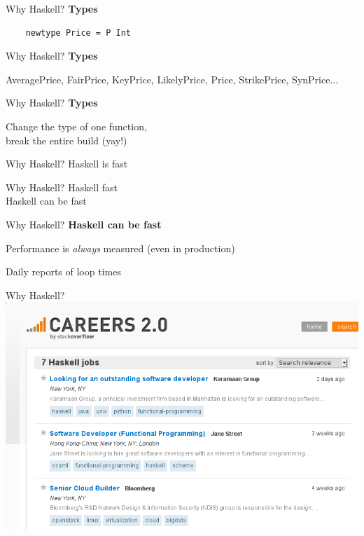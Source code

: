 \documentclass[20pt]{beamer}
\newcommand{\vspaced}{
    \vspace{5mm}
}
\begin{document}
\begin{frame}[fragile]{Why Haskell?}
    \textbf{Types} \\
    \vspaced
    \begin{lstlisting}
    newtype Price = P Int
    \end{lstlisting}
\end{frame}

\begin{frame}[fragile]{Why Haskell?}
    \textbf{Types} \\
    \vspaced
    AveragePrice, FairPrice, KeyPrice, LikelyPrice, Price, StrikePrice,
    SynPrice...
\end{frame}

\begin{frame}[fragile]{Why Haskell?}
    \textbf{Types} \\
    \vspaced
    Change the type of one function, \\
    break the entire build (yay!) \\
\end{frame}

\begin{frame}{Why Haskell?}
    Haskell is fast
\end{frame}

\begin{frame}{Why Haskell?}
    Haskell  fast \\
    Haskell can be fast
\end{frame}

\begin{frame}{Why Haskell?}
    \textbf{Haskell can be fast} \\
    \vspaced
    Performance is \emph{always} measured (even in production) \\
    \vspaced
    Daily reports of loop times
\end{frame}

\begin{frame}{Why Haskell?}
    \includegraphics[width=\textwidth]{images/haskell-jobs.png}
\end{frame}
\end{document}
